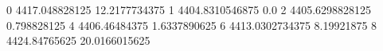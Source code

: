 0 4417.048828125 12.2177734375
1 4404.8310546875 0.0
2 4405.6298828125 0.798828125
4 4406.46484375 1.6337890625
6 4413.0302734375 8.19921875
8 4424.84765625 20.0166015625
